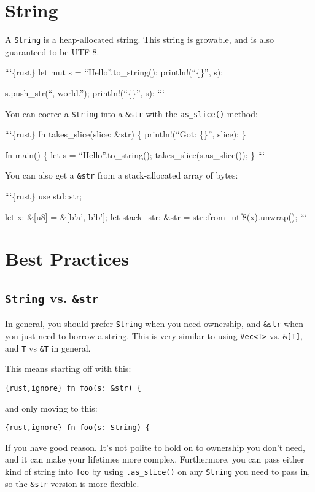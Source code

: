 \documentclass[]{article}
\begin{document}
\section{String}\label{string}

A \texttt{String} is a heap-allocated string. This string is growable,
and is also guaranteed to be UTF-8.

```\{rust\} let mut s = ``Hello''.to\_string(); println!(``\{\}'', s);

s.push\_str(``, world.''); println!(``\{\}'', s); ```

You can coerce a \texttt{String} into a \texttt{\&str} with the
\texttt{as\_slice()} method:

```\{rust\} fn takes\_slice(slice: \&str) \{ println!(``Got: \{\}'',
slice); \}

fn main() \{ let s = ``Hello''.to\_string();
takes\_slice(s.as\_slice()); \} ```

You can also get a \texttt{\&str} from a stack-allocated array of bytes:

```\{rust\} use std::str;

let x: \&{[}u8{]} = \&{[}b'a', b'b'{]}; let stack\_str: \&str =
str::from\_utf8(x).unwrap(); ```

\section{Best Practices}\label{best-practices}

\subsection{\texttt{String} vs. \texttt{\&str}}\label{string-vs.-str}

In general, you should prefer \texttt{String} when you need ownership,
and \texttt{\&str} when you just need to borrow a string. This is very
similar to using \texttt{Vec\textless{}T\textgreater{}} vs.
\texttt{\&{[}T{]}}, and \texttt{T} vs \texttt{\&T} in general.

This means starting off with this:

\texttt{\{rust,ignore\} fn foo(s: \&str) \{}

and only moving to this:

\texttt{\{rust,ignore\} fn foo(s: String) \{}

If you have good reason. It's not polite to hold on to ownership you
don't need, and it can make your lifetimes more complex. Furthermore,
you can pass either kind of string into \texttt{foo} by using
\texttt{.as\_slice()} on any \texttt{String} you need to pass in, so the
\texttt{\&str} version is more flexible.
\end{document}
